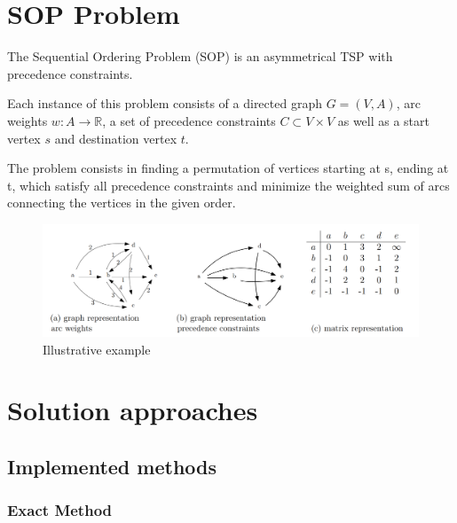 \documentclass[]{article}
\begin{document}
    \maketitle
    \tableofcontents



    \section{SOP Problem}

    The Sequential Ordering Problem (SOP) is an asymmetrical TSP with precedence constraints. 

    Each instance of this problem consists of a directed graph $G=(V, A)$, arc weights $w: A \rightarrow \mathbb{R}$, a set of precedence constraints $C \subset V \times V$ as well as a start vertex $s$ and destination vertex $t$.

    The problem consists in finding a permutation of vertices starting at s, ending at t, which satisfy all precedence constraints and minimize the weighted sum of arcs connecting the vertices in the given order. \cite{libralesso2019tree}

    \begin{figure}[hbt]
    	\includegraphics[width=\textwidth]{files/graphic_sop_prob.png}
    	\centering
    	\caption{Illustrative example \cite{libralesso2019tree}}
    \end{figure}



    \section{Solution approaches}

    \subsection{Implemented methods}
    
    \subsubsection{Exact Method}
    
\end{document}
